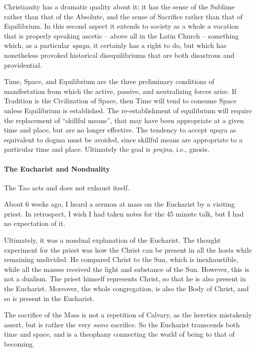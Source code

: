 \begin{quotex}
Christianity has a dramatic quality about it: it has the sense of the Sublime rather than that of the Absolute, and the sense of Sacrifice rather than that of Equilibrium. In this second aspect it extends to society as a whole a vocation that is properly speaking ascetic – above all in the Latin Church – something which, as a particular \emph{upaya}, it certainly has a right to do, but which has nonetheless provoked historical disequilibriums that are both disastrous and providential.

\end{quotex}
Time, Space, and Equilibrium are the three preliminary conditions of manifestation from which the active, passive, and neutralizing forces arise. If Tradition is the Civilization of Space, then Time will tend to consume Space unless Equilibrium is established. The re-establishment of equilibrium will require the replacement of “skillful means”, that may have been appropriate at a given time and place, but are no longer effective. The tendency to accept upaya as equivalent to dogma must be avoided, since skillful means are appropriate to a particular time and place. Ultimately the goal is \emph{prajna}, i.e., gnosis.

\paragraph{The Eucharist and Nonduality}
\begin{quotex}
The Tao acts and does not exhaust itself. 

\end{quotex}
About 6 weeks ago, I heard a sermon at mass on the Eucharist by a visiting priest. In retrospect, I wish I had taken notes for the 45 minute talk, but I had no expectation of it.

Ultimately, it was a nondual explanation of the Eucharist. The thought experiment for the priest was how the Christ can be present in all the hosts while remaining undivided. He compared Christ to the Sun, which is inexhaustible, while all the masses received the light and substance of the Sun. However, this is not a dualism. The priest himself represents Christ, so that he is also present in the Eucharist. Moreover, the whole congregation, is also the Body of Christ, and so is present in the Eucharist.

The sacrifice of the Mass is not a repetition of Calvary, as the heretics mistakenly assert, but is rather the very \emph{same} sacrifice. So the Eucharist transcends both time and space, and is a theophany connecting the world of being to that of becoming.

